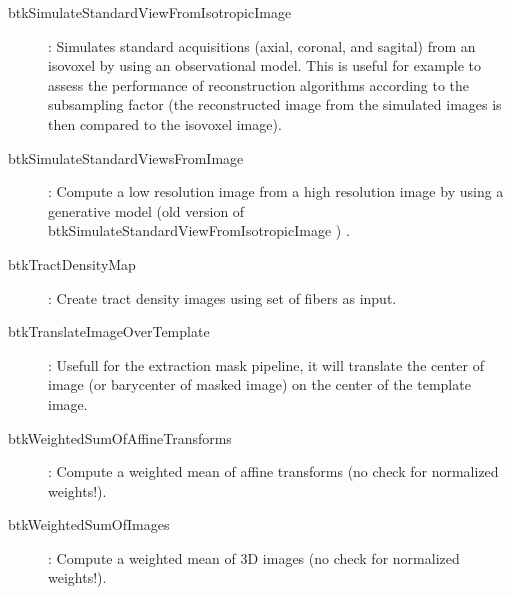 \begin{description}
\item[btkSimulateStandardViewFromIsotropicImage]: Simulates standard acquisitions (axial, coronal, and sagital) from an isovoxel by using an observational model. This is useful for example to assess the performance of reconstruction algorithms according to the subsampling factor (the reconstructed image from the simulated images is then compared to the isovoxel image). 
\item[btkSimulateStandardViewsFromImage]: Compute a low resolution image from a high resolution image by using a generative model (old version of btkSimulateStandardViewFromIsotropicImage )
.%
\item[btkTractDensityMap]: Create tract density images using set of fibers as input.
\item[btkTranslateImageOverTemplate]: Usefull for the extraction mask pipeline, it will translate the center of image (or barycenter of masked image) on the center of the template image.
\item[btkWeightedSumOfAffineTransforms]: Compute a weighted mean of affine transforms (no check for normalized weights!).
\item[btkWeightedSumOfImages]: Compute a weighted mean of 3D images (no check for normalized weights!).



\end{description}
